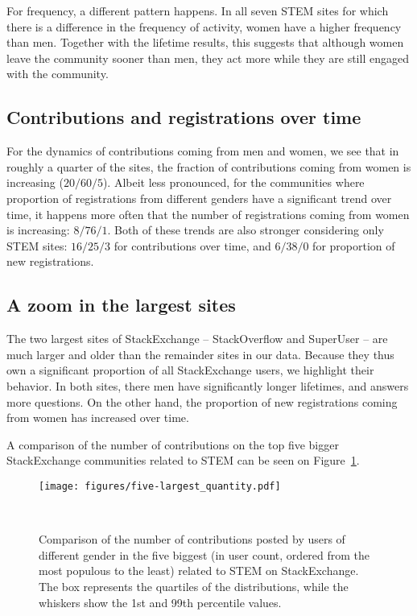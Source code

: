 For frequency, a different pattern happens. In all seven STEM sites for which there is a difference in the frequency of activity, women have a higher frequency than men. Together with the lifetime results, this suggests that although women leave the community sooner than men, they act more while they are still engaged with the community.


\subsection{Contributions and registrations over time}
For the dynamics of contributions coming from men and women, we see that in roughly a quarter of the sites, the fraction of contributions coming from women is increasing ($20/60/5$). Albeit less pronounced, for the communities where proportion of registrations from different genders have a significant trend over time, it happens more often that the number of registrations coming from women is increasing: $8/76/1$. Both of these trends are also stronger considering only STEM sites: $16/25/3$ for contributions over time, and $6/38/0$ for proportion of new registrations.



\subsection{A zoom in the largest sites} %
The two largest sites of StackExchange -- StackOverflow and SuperUser -- are much larger and older than the remainder sites in our data. Because they thus own a significant proportion of all StackExchange users, we highlight their behavior. In both sites, there men have significantly longer lifetimes, and answers more questions. On the other hand, the proportion of new registrations coming from women has increased over time. 

A comparison of  the number of contributions on the top five bigger StackExchange communities related to STEM can be seen on Figure~\ref{figure:top-five}.



\begin{figure}
  \texttt{[image: figures/five-largest\_quantity.pdf]}
  \caption{Comparison of the number of contributions posted by users of different gender in the five biggest (in user count, ordered from the most populous to the least) related to STEM on StackExchange. The box represents the quartiles of the distributions, while the whiskers show the 1st and 99th percentile values. }~\label{figure:top-five}
\end{figure}




